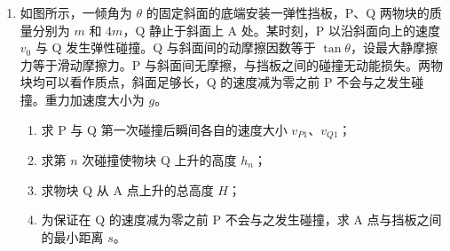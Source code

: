 \documentclass[\gkver]{gaokaozhenti}
\begin{document}
\begin{enumerate}
{（2）设区域Ⅱ中粒子沿 $z$ 轴方向的分速度为 $v_{z}$，沿 $x$ 轴正方向加速度大小为 $a$，位移大小为 $x$，运动时间为 $t$，由牛顿第二定律得 $qE=ma$；粒子在 $z$ 轴方向做匀速直线运动，由运动合成与分解的规律得 $v_{z}=v\cos\alpha$，$d=v_{z}t$；粒子在 $x$ 方向做初速度为零的匀加速直线运动，由运动学公式得 $x=\frac{1}{2}at^{2}$，联立解得 $x=\frac{md^{2}E}{4mU-2qd^{2}B^{2}}$。

（3）设粒子沿 $y$ 方向偏离 $z$ 轴的距离为 $y$，其中在区域Ⅱ中沿 $y$ 方向偏离的距离为 $y'$，由运动学公式得 $y'=vt\sin\alpha$，由题意得 $y=L+y'$，联立解得 $y=R-\sqrt{R^{2}-d^{2}}+\frac{d^{2}}{\sqrt{R^{2}-d^{2}}}$。

（4）根据（2）中结果 $x=\frac{md^{2}E}{4mU-2qd^{2}B^{2}}=\frac{d^{2}E}{4U-2d^{2}B^{2}\frac{q}{m}}$，可知 $\frac{q}{m}$ 越大，粒子打在记录板上的位置 $x$ 的坐标值越大，可得 s$_{1}$、s$_{2}$、s$_{3}$ 分别对应氚核 、氦核 、质子  的位置。
}

\item
如图所示，一倾角为 $\theta$ 的固定斜面的底端安装一弹性挡板，P、Q 两物块的质量分别为 $m$ 和 $4m$，Q 静止于斜面上 A 处。某时刻，P 以沿斜面向上的速度 $v_{0}$ 与 Q 发生弹性碰撞。Q 与斜面间的动摩擦因数等于 $\tan\theta$，设最大静摩擦力等于滑动摩擦力。P 与斜面间无摩擦，与挡板之间的碰撞无动能损失。两物块均可以看作质点，斜面足够长，Q 的速度减为零之前 P 不会与之发生碰撞。重力加速度大小为 $g$。
\begin{enumerate}
\item
求 P 与 Q 第一次碰撞后瞬间各自的速度大小 $v_{P1}$、$v_{Q1}$；

\item
求第 $n$ 次碰撞使物块 Q 上升的高度 $h_{n}$；

\item
求物块 Q 从 A 点上升的总高度 $H$；

\item
为保证在 Q 的速度减为零之前 P 不会与之发生碰撞，求 A 点与挡板之间的最小距离 $s$。
\end{enumerate}


\end{enumerate}
\end{document}

